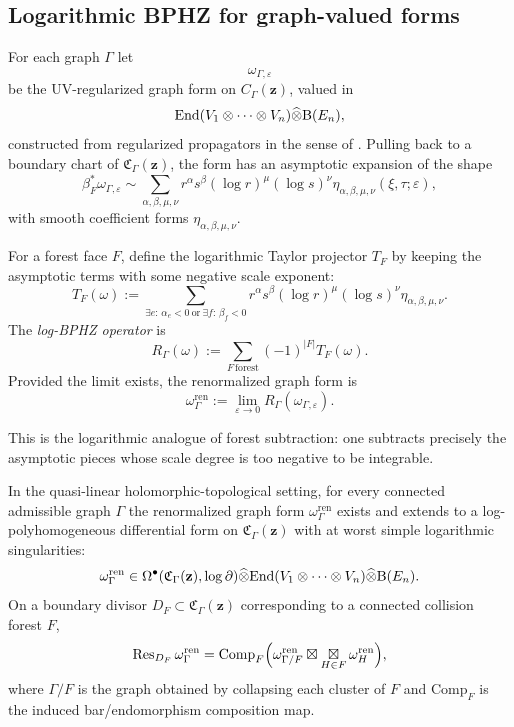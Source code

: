 \subsection{Logarithmic BPHZ for graph-valued forms}
For each graph $\Gamma$ let
\[
 \omega_{\Gamma,\varepsilon}
\]
be the UV-regularized graph form on $C_\Gamma(\mathbf z)$, valued in
\[
 \mathrm{End}(V_1\otimes\cdots\otimes V_n)\widehat\otimes \mathrm B(E_n),
\]
constructed from regularized propagators in the sense of \cite{GKW25,DNP25}. Pulling back to a boundary chart of $\mathfrak C_\Gamma(\mathbf z)$, the form has an asymptotic expansion of the shape
\[
 \beta_F^*\omega_{\Gamma,\varepsilon}
 \sim
 \sum_{\alpha,\beta,\mu,\nu}
 r^{\alpha}s^{\beta}(\log r)^{\mu}(\log s)^{\nu}
 \eta_{\alpha,\beta,\mu,\nu}(\xi,\tau;\varepsilon),
\]
with smooth coefficient forms $\eta_{\alpha,\beta,\mu,\nu}$.

\begin{definition}\label{def:log-bphz}
For a forest face $F$, define the logarithmic Taylor projector $T_F$ by keeping the asymptotic terms with some negative scale exponent:
\[
 T_F(\omega)
 :=
 \sum_{\exists e:\,\alpha_e<0\ \text{or}\ \exists f:\,\beta_f<0}
 r^{\alpha}s^{\beta}(\log r)^{\mu}(\log s)^{\nu}
 \eta_{\alpha,\beta,\mu,\nu}.
\]
The \emph{log-BPHZ operator} is
\[
 R_\Gamma(\omega):=\sum_{F\,\mathrm{forest}}(-1)^{|F|}T_F(\omega).
\]
Provided the limit exists, the renormalized graph form is
\[
 \omega_\Gamma^{\mathrm{ren}}:=\lim_{\varepsilon\to 0}R_\Gamma(\omega_{\Gamma,\varepsilon}).
\]
\end{definition}

This is the logarithmic analogue of forest subtraction: one subtracts precisely the asymptotic pieces whose scale degree is too negative to be integrable.

\begin{theorem}\label{thm:log-bphz-existence}
In the quasi-linear holomorphic-topological setting, for every connected admissible graph $\Gamma$ the renormalized graph form $\omega_\Gamma^{\mathrm{ren}}$ exists and extends to a log-polyhomogeneous differential form on $\mathfrak C_\Gamma(\mathbf z)$ with at worst simple logarithmic singularities:
\[
 \omega_\Gamma^{\mathrm{ren}}
 \in
 \Omega^{\bullet}(\mathfrak C_\Gamma(\mathbf z),\log\partial)
 \widehat\otimes
 \mathrm{End}(V_1\otimes\cdots\otimes V_n)\widehat\otimes \mathrm B(E_n).
\]
On a boundary divisor $D_F\subset\mathfrak C_\Gamma(\mathbf z)$ corresponding to a connected collision forest $F$,
\[
 \mathrm{Res}_{D_F}\,\omega_\Gamma^{\mathrm{ren}}
 =
 \mathrm{Comp}_F\Big(
 \omega_{\Gamma/F}^{\mathrm{ren}}
 \boxtimes
 \mathop{\boxtimes}\displaylimits_{H\in F}\omega_H^{\mathrm{ren}}
 \Big),
\]
where $\Gamma/F$ is the graph obtained by collapsing each cluster of $F$ and $\mathrm{Comp}_F$ is the induced bar/endomorphism composition map.
\end{theorem}

